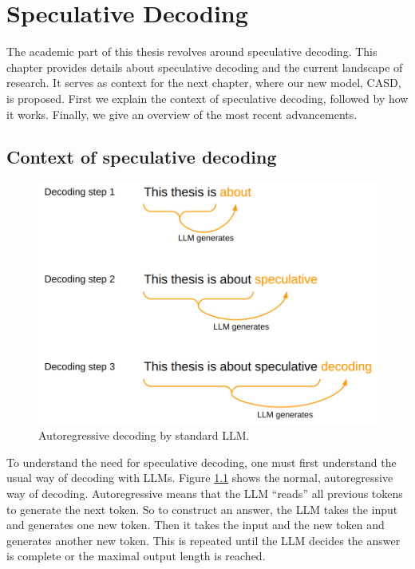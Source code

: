 
\chapter{Speculative Decoding}
\label{sec:speculative_decoding}

The academic part of this thesis revolves around speculative decoding. This chapter provides details about speculative decoding and the current landscape of research. It serves as context for the next chapter, where our new model, CASD, is proposed. First we explain the context of speculative decoding, followed by how it works. Finally, we give an overview of the most recent advancements. 

\section{Context of speculative decoding}

\begin{figure}[h]
	\centering
	\includegraphics[width=0.7\linewidth]{fig/spec_dec_autoregressive.png}
	\caption{Autoregressive decoding by standard LLM.}
	\label{fig:spec_dec_autoregressive}
\end{figure}

To understand the need for speculative decoding, one must first understand the usual way of decoding with LLMs. Figure \ref{fig:spec_dec_autoregressive} shows the normal, autoregressive way of decoding. Autoregressive means that the LLM ``reads'' all previous tokens to generate the next token. So to construct an answer, the LLM takes the input and generates one new token. Then it takes the input and the new token and generates another new token. This is repeated until the LLM decides the answer is complete or the maximal output length is reached.

